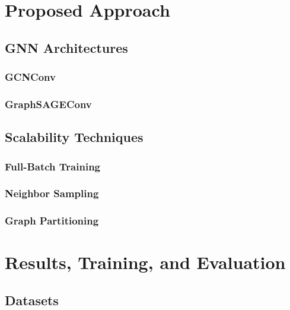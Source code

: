 \documentclass{article}
\begin{document}


\section{Proposed Approach}


\subsection{GNN Architectures}

\subsubsection{GCNConv}


\subsubsection{GraphSAGEConv}

\subsection{Scalability Techniques}

\subsubsection{Full-Batch Training}

\subsubsection{Neighbor Sampling}


\subsubsection{Graph Partitioning}




\section{Results, Training, and Evaluation}

\subsection{Datasets}
\end{document}
